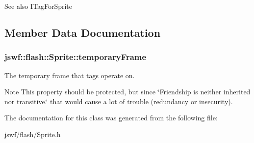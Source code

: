 \begin{DoxySeeAlso}{See also}
I\+Tag\+For\+Sprite 
\end{DoxySeeAlso}


\subsection{Member Data Documentation}
\hypertarget{classjswf_1_1flash_1_1_sprite_aaef02bf73bbb9cb5120e06e32711c2e2}{
\subsubsection[{temporary\+Frame}]{ jswf\+::flash\+::\+Sprite\+::temporary\+Frame}}\label{classjswf_1_1flash_1_1_sprite_aaef02bf73bbb9cb5120e06e32711c2e2}


The temporary frame that tags operate on. 

\begin{DoxyNote}{Note}
This property should be protected, but since \char`\"{}\+Friendship is neither inherited nor transitive.\char`\"{} that would cause a lot of trouble (redundancy or insecurity). 
\end{DoxyNote}


The documentation for this class was generated from the following file\+:\begin{DoxyCompactItemize}
\item 
jswf/flash/Sprite.\+h\end{DoxyCompactItemize}
